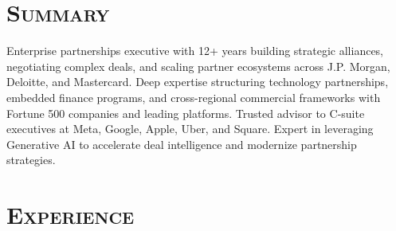 \documentclass[11pt,a4paper]{moderncv}
\begin{document}
\makecvtitle
\vspace{-40pt}

\section{\textsc{Summary}}
\vspace{-5pt}
Enterprise partnerships executive with 12+ years building strategic alliances, negotiating complex deals, and scaling partner ecosystems across J.P. Morgan, Deloitte, and Mastercard. Deep expertise structuring technology partnerships, embedded finance programs, and cross-regional commercial frameworks with Fortune 500 companies and leading platforms. Trusted advisor to C-suite executives at Meta, Google, Apple, Uber, and Square. Expert in leveraging Generative AI to accelerate deal intelligence and modernize partnership strategies.

\section{\textsc{Experience}}
\end{document}
